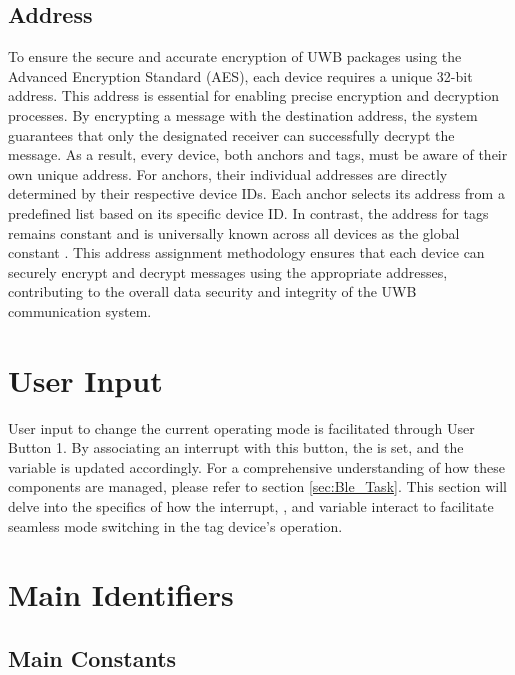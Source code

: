 \subsection{Address}
To ensure the secure and accurate encryption of UWB packages using the Advanced Encryption Standard (AES), each device requires a unique 32-bit address. 
This address is essential for enabling precise encryption and decryption processes. 
By encrypting a message with the destination address, the system guarantees that only the designated receiver can successfully decrypt the message. 
As a result, every device, both anchors and tags, must be aware of their own unique address.
\vspace{4pt}
\newline
For anchors, their individual addresses are directly determined by their respective device IDs. 
Each anchor selects its address from a predefined list based on its specific device ID. 
In contrast, the address for tags remains constant and is universally known across all devices as the global constant . 
This address assignment methodology ensures that each device can securely encrypt and decrypt messages using the appropriate addresses, contributing to the overall data security and integrity of the UWB communication system.

\section{User Input}
User input to change the current operating mode is facilitated through User Button 1. 
By associating an interrupt with this button, the  is set, and the  variable is updated accordingly. 
For a comprehensive understanding of how these components are managed, please refer to section \ref{sec:Ble_Task}. 
This section will delve into the specifics of how the interrupt, , and  variable interact to facilitate seamless mode switching in the tag device's operation. 

\section{Main Identifiers}

\subsection{Main Constants}

